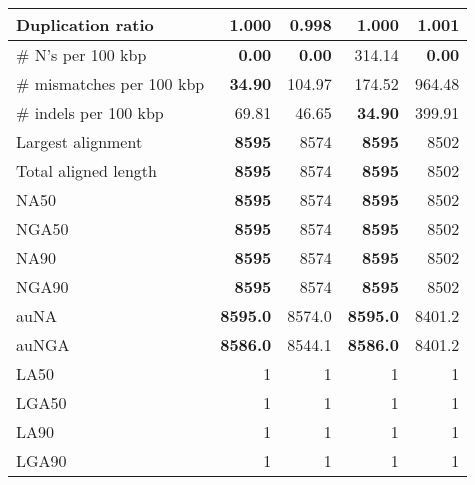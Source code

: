 \documentclass[12pt,a4paper]{article}
\begin{document}
\begin{table}[ht]
\begin{center}
\begin{tabular}{|l*{4}{|r}|}
Duplication ratio & 1.000 & {\bf 0.998} & 1.000 & 1.001 \\ \hline
\# N's per 100 kbp & {\bf 0.00} & {\bf 0.00} & 314.14 & {\bf 0.00} \\ \hline
\# mismatches per 100 kbp & {\bf 34.90} & 104.97 & 174.52 & 964.48 \\ \hline
\# indels per 100 kbp & 69.81 & 46.65 & {\bf 34.90} & 399.91 \\ \hline
Largest alignment & {\bf 8595} & 8574 & {\bf 8595} & 8502 \\ \hline
Total aligned length & {\bf 8595} & 8574 & {\bf 8595} & 8502 \\ \hline
NA50 & {\bf 8595} & 8574 & {\bf 8595} & 8502 \\ \hline
NGA50 & {\bf 8595} & 8574 & {\bf 8595} & 8502 \\ \hline
NA90 & {\bf 8595} & 8574 & {\bf 8595} & 8502 \\ \hline
NGA90 & {\bf 8595} & 8574 & {\bf 8595} & 8502 \\ \hline
auNA & {\bf 8595.0} & 8574.0 & {\bf 8595.0} & 8401.2 \\ \hline
auNGA & {\bf 8586.0} & 8544.1 & {\bf 8586.0} & 8401.2 \\ \hline
LA50 & 1 & 1 & 1 & 1 \\ \hline
LGA50 & 1 & 1 & 1 & 1 \\ \hline
LA90 & 1 & 1 & 1 & 1 \\ \hline
LGA90 & 1 & 1 & 1 & 1 \\ \hline
\end{tabular}
\end{center}
\end{table}
\end{document}
